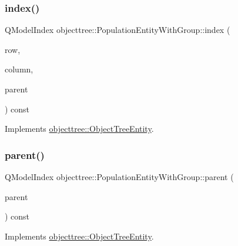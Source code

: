 \mbox{\label{classobjecttree_1_1_population_entity_with_group_a244b149daf0735eca66a33b6f68773ed}} 
\subsubsection{\texorpdfstring{index()}{index()}}
{\footnotesize\ttfamily Q\+Model\+Index objecttree\+::\+Population\+Entity\+With\+Group\+::index (\begin{DoxyParamCaption}\item[{int}]{row,  }\item[{int}]{column,  }\item[{const Q\+Model\+Index \&}]{parent }\end{DoxyParamCaption}) const\hspace{0.3cm}{\ttfamily [virtual]}}



Implements \mbox{\hyperlink{classobjecttree_1_1_object_tree_entity_a9ccaab3b27e65b1ed8b22f00c57a1082}{objecttree\+::\+Object\+Tree\+Entity}}.

\mbox{\label{classobjecttree_1_1_population_entity_with_group_af3100a2aa24aedfa6f77cef59736ec02}} 
\subsubsection{\texorpdfstring{parent()}{parent()}}
{\footnotesize\ttfamily Q\+Model\+Index objecttree\+::\+Population\+Entity\+With\+Group\+::parent (\begin{DoxyParamCaption}\item[{const Q\+Model\+Index \&}]{parent }\end{DoxyParamCaption}) const\hspace{0.3cm}{\ttfamily [virtual]}}



Implements \mbox{\hyperlink{classobjecttree_1_1_object_tree_entity_a2d1b13c056476f87637aacd7e99e7305}{objecttree\+::\+Object\+Tree\+Entity}}.

